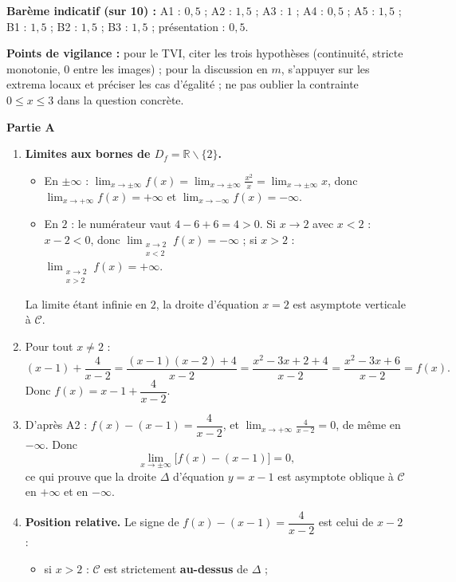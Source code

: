 \documentclass[11pt]{article}
\newcommand{\cle}[1]{{\popxbold\color{popdark}#1}}
\def\setminus{\mathbin{\backslash}}\let\smallsetminus\setminus
\begin{document}
\begin{corrige}
\textbf{Barème indicatif (sur 10) :} A1 : $0{,}5$ ; A2 : $1{,}5$ ; A3 : $1$ ; A4 : $0{,}5$ ; A5 : $1{,}5$ ; B1 : $1{,}5$ ; B2 : $1{,}5$ ; B3 : $1{,}5$ ; présentation : $0{,}5$.

\textbf{Points de vigilance :} pour le TVI, citer les trois hypothèses (continuité, stricte monotonie, $0$ entre les images) ; pour la discussion en $m$, s'appuyer sur les extrema locaux et préciser les cas d'égalité ; ne pas oublier la contrainte $0\leq x\leq 3$ dans la question concrète.
\end{corrige}

\begin{corrige}
\textbf{Partie A}
\begin{enumerate}
\item \textbf{Limites aux bornes de $D_f=\mathbb{R}\setminus\{2\}$.}
\begin{itemize}
\item En $\pm\infty$ : $\displaystyle\lim_{x\to\pm\infty}f(x)=\lim_{x\to\pm\infty}\frac{x^2}{x}=\lim_{x\to\pm\infty}x$, donc $\displaystyle\lim_{x\to +\infty}f(x)=+\infty$ et $\displaystyle\lim_{x\to -\infty}f(x)=-\infty$.
\item En $2$ : le numérateur vaut $4-6+6=4>0$. Si $x\to 2$ avec $x<2$ : $x-2<0$, donc $\displaystyle\lim_{\substack{x\to 2\\ x<2}}f(x)=-\infty$ ; si $x>2$ : $\displaystyle\lim_{\substack{x\to 2\\ x>2}}f(x)=+\infty$.
\end{itemize}
La limite étant infinie en $2$, la droite d'équation $\boxed{x=2}$ est \cle{asymptote verticale} à $\mathscr{C}$.
\item Pour tout $x\neq 2$ :
\[ (x-1)+\frac{4}{x-2}=\frac{(x-1)(x-2)+4}{x-2}=\frac{x^2-3x+2+4}{x-2}=\frac{x^2-3x+6}{x-2}=f(x). \]
Donc $\boxed{f(x)=x-1+\dfrac{4}{x-2}}$.
\item D'après A2 : $f(x)-(x-1)=\dfrac{4}{x-2}$, et $\displaystyle\lim_{x\to +\infty}\frac{4}{x-2}=0$, de même en $-\infty$. Donc
\[ \lim_{x\to \pm\infty}\bigl[f(x)-(x-1)\bigr]=0, \]
ce qui prouve que la droite $\Delta$ d'équation $\boxed{y=x-1}$ est \cle{asymptote oblique} à $\mathscr{C}$ en $+\infty$ et en $-\infty$.
\item \textbf{Position relative.} Le signe de $f(x)-(x-1)=\dfrac{4}{x-2}$ est celui de $x-2$ :
\begin{itemize}
\item si $x>2$ : $\mathscr{C}$ est strictement \textbf{au-dessus} de $\Delta$ ;

\end{itemize}
\end{enumerate}
\end{corrige}
\end{document}

